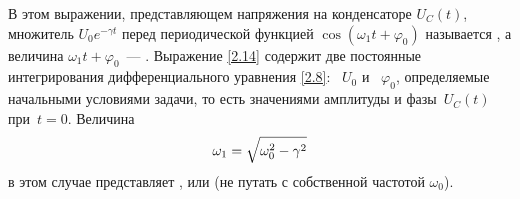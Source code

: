 \documentclass[a4paper,oneside]{book}
\begin{document}
В этом выражении, представляющем  напряжения на
конденсаторе $U_C(t)$, множитель $U_0e^{-\gamma t}$ перед периодической функцией
$\cos(\omega_1 t+\varphi_0)$ называется , а величина $\omega_1t+\varphi_0$~--- . Выражение \eqref{2.14} содержит две постоянные интегрирования
дифференциального уравнения \eqref{2.8}: ~$U_0$ и
~$\varphi_0$, определяемые начальными условиями
задачи, то есть значениями амплитуды и фазы~$U_C(t)$ при~$t=0$. Величина
\begin{equation}\eqmark{2.15}
\omega_1=\sqrt{\omega_0^2-\gamma^2}
\end{equation}
в этом случае представляет , или
 (не путать с собственной частотой
$\omega_0$).
\end{document}
